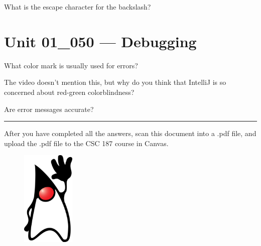 \documentclass[letterpaper,12pt]{exam}
\newcommand{\unit}{Unit 01}
\begin{document}
\begin{questions}
\begin{samepage}
	\question What is the escape character for the backslash?
	\vspace{5mm}
\end{samepage}

\section*{\unit\_050 --- Debugging} %

\begin{samepage}
	\question What color mark is usually used for errors?
	\vspace{5mm}
\end{samepage}

\begin{samepage}
	\question The video doesn't mention this, but why do you think that IntelliJ is so concerned about red-green colorblindness?
	\vspace{5mm}
\end{samepage}

\begin{samepage}
	\question Are error messages accurate?
	\vspace{20mm}
\end{samepage}


\end{questions}
\hrule
\vspace{5mm}
\noindent After you have completed all the answers, scan this document into a .pdf file, and upload the .pdf file to the CSC 187 course in Canvas. 
\vspace{5mm}

\begin{figure}[b]\label{end}
	\center
	\includegraphics[width=1in]{../duke.png}
\end{figure}
\end{document}
